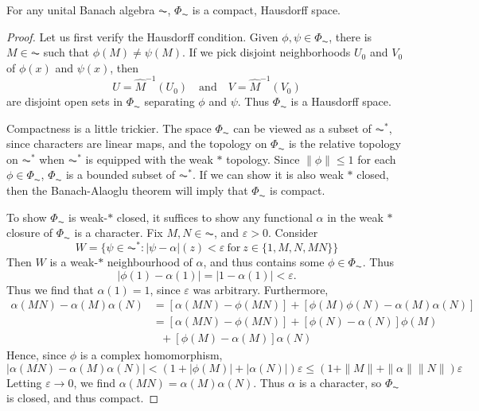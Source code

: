 \begin{theorem}
    For any unital Banach algebra $\AC$, $\Phi_{\AC}$ is a compact, Hausdorff space.
\end{theorem}
\begin{proof}
    Let us first verify the Hausdorff condition. Given $\phi, \psi \in \Phi_{\AC}$, there is $M \in \AC$ such that $\phi(M) \neq \psi(M)$. If we pick disjoint neighborhoods $U_0$ and $V_0$ of $\phi(x)$ and $\psi(x)$, then
    \[ U = \widehat{M}^{-1}(U_0)  \quad\text{and}\quad V = \widehat{M}^{-1}(V_0) \]
    are disjoint open sets in $\Phi_{\AC}$ separating $\phi$ and $\psi$. Thus $\Phi_{\AC}$ is a Hausdorff space.

    Compactness is a little trickier. The space $\Phi_{\AC}$ can be viewed as a subset of $\AC^*$, since characters are linear maps, and the topology on $\Phi_{\AC}$ is the relative topology on $\AC^*$ when $\AC^*$ is equipped with the weak $*$ topology. Since $\| \phi \| \leq 1$ for each $\phi \in \Phi_{\AC}$, $\Phi_{\AC}$ is a bounded subset of $\AC^*$. If we can show it is also weak $*$ closed, then the Banach-Alaoglu theorem will imply that $\Phi_{\AC}$ is compact.

    To show $\Phi_{\AC}$ is weak-$*$ closed, it suffices to show any functional $\alpha$ in the weak $*$ closure of $\Phi_{\AC}$ is a character. Fix $M,N \in \AC$, and $\varepsilon > 0$. Consider
    \[ W = \{ \psi \in \AC^* : | \psi - \alpha | (z) < \varepsilon\ \text{for}\ z \in \{ 1, M, N, MN \} \} \]
    Then $W$ is a weak-$*$ neighbourhood of $\alpha$, and thus contains some $\phi \in \Phi_{\AC}$. Thus
    \[ |\phi(1) - \alpha(1)| = | 1 - \alpha(1) | < \varepsilon. \]
    Thus we find that $\alpha(1) = 1$, since $\varepsilon$ was arbitrary. Furthermore,
    \begin{align*}
        \alpha(MN) -   \alpha(M) \alpha(N) &= [\alpha(MN) - \phi(MN)] + [\phi(M)\phi(N) - \alpha(M)\alpha(N)]\\
        &= [\alpha(MN) - \phi(MN)] + [\phi(N) - \alpha(N)] \phi(M)\\
        &\ \ \ + [\phi(M) - \alpha(M)] \alpha(N)
    \end{align*}
    Hence, since $\phi$ is a complex homomorphism,
    \[ | \alpha(MN) - \alpha(M) \alpha(N) | < (1 + |\phi(M)| + |\alpha(N)|) \varepsilon \leq (1 + \| M \| + \| \alpha \| \| N \|) \varepsilon \]
    Letting $\varepsilon \to 0$, we find $\alpha(MN) = \alpha(M) \alpha(N)$. Thus $\alpha$ is a character, so $\Phi_{\AC}$ is closed, and thus compact.
\end{proof}

